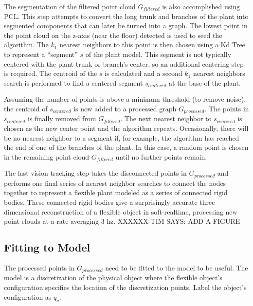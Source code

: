 \documentclass[runningheads,a4paper]{llncs}
\begin{document}
The segmentation of the filtered point cloud $G_{filtered}$ is also accomplished using PCL. This step attempts to convert the long trunk and branches of the plant into segmented components that can later be turned into a graph. The lowest point in the point cloud on the z-axis (near the floor) detected is used to seed the algorithm. The $k_1$ nearest neighbors to this point is then chosen using a Kd Tree to represent a “segment” $s$ of the plant model. This segment is not typically centered with the plant trunk or branch’s center, so an additional centering step is required. The centroid of the $s$ is calculated and a second $k_1$ nearest neighbors search is performed to find a centered segment $s_{centered}$ at the base of the plant.

Assuming the number of points is above a minimum threshold (to remove noise), the centroid of $s_{centered}$ is now added to a processed graph $G_{processed}$. The points in $s_{centered}$ is finally removed from $G_{filtered}$. The next nearest neighbor to $s_{centered}$ is chosen as the new center point and the algorithm repeats. Occasionally, there will be no nearest neighbor to a segment if, for example, the algorithm has reached the end of one of the branches of the plant. In this case, a random point is chosen in the remaining point cloud $G_{filtered}$ until no further points remain.

The last vision tracking step takes the disconnected points in $G_{processed}$ and performs one final series of nearest neighbor searches to connect the nodes together to represent a flexible plant modeled as a series of connected rigid bodies. These connected rigid bodies give a surprisingly accurate three dimensional reconstruction of a flexible object in soft-realtime, processing new point clouds at a rate averaging 3 hz. XXXXXX TIM SAYS: ADD A FIGURE

\subsection{Fitting to Model \label{sec-fit}}

The processed points in $G_{processed}$ need to be fitted to the model to be useful. The model is a discretization of the physical object where the flexible object’s configuration specifies the location of the discretization points. Label the object’s configuration as $q_o$. 
\end{document}
